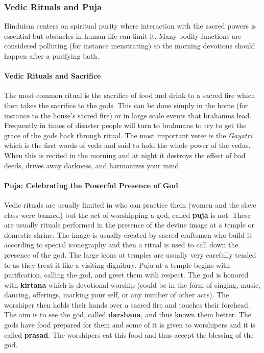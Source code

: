 \documentclass{article}
\begin{document}
\subsubsection{Vedic Rituals and Puja}
\label{ssub:vedic_rituals_and_puja}
Hinduism centers on spiritual purity where interaction with the sacred powers is essential but obstacles in human life can limit it. Many bodily functions are considered polluting (for instance menstrating) so the morning devotions should happen after a purifying bath.

\paragraph{Vedic Rituals and Sacrifice}
\label{par:vedic_rituals_and_sacrifice}
The most common ritual is the sacrifice  of food and drink to a sacred fire which then takes the sacrifice to the gods. This can be done simply in the home (for instance to the house's sacred fire) or in large scale events that brahamns lead. Frequently in times of disaster people will turn to brahmans to try to get the grace of the gods back through ritual. The most important verse is the \emph{Gayatri} which is the first words of veda and said to hold the whole power of the vedas. When this is recited in the morning and at night it destroys the effect of bad deeds, drives away darkness, and harmonizes your mind.

\paragraph{Puja: Celebrating the Powerful Presence of God}
\label{par:puja_celebrating_the_powerful_presence_of_god}
Vedic rituals are usually limited in who can practice them (women and the slave class were banned) but the act of worshipping a god, called \textbf{puja} is not. These are usually rituals performed in the presence of the devine image at a temple or domestic shrine. The image is usually created by sacred craftsmen who build it according to special iconography and then a ritual is used to call down the presence of the god. The large icons at temples are usually very carefully tended to as they treat it like a visiting dignitary. Puja at a temple begins with purification, calling the god, and greet them with respect. The god is honored with \textbf{kirtana} which is devotional worship (could be in the form of singing, music, dancing, offerings, marking your self, or any number of other acts). The worshiper then holds their hands over a sacred fire and touches their forehead. The aim is to see the god, called \textbf{darshana}, and thus known them better. The gods have food prepared for them and some of it is given to worshipers and it is called \textbf{prasad}. The worshipers eat this food and thus accept the blessing of the god.
\end{document}
